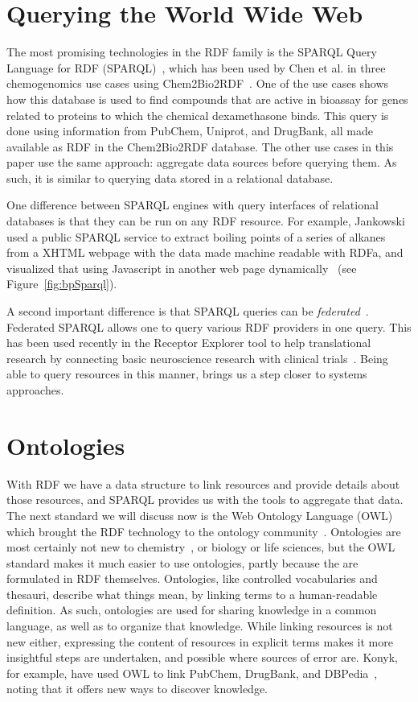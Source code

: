 \documentclass[10pt]{bmc_article}
\newenvironment{bmcformat}{\begin{raggedright}\baselineskip20pt\sloppy\setboolean{publ}{false}}{\end{raggedright}\baselineskip20pt\sloppy}
\begin{document}
\begin{bmcformat}
\section{Querying the World Wide Web}

The most promising technologies in the RDF family is the
SPARQL Query Language for RDF (SPARQL)~\cite{PrudHommeaux2008}, which has been
used by Chen et al. in three chemogenomics use cases using Chem2Bio2RDF~\cite{CHE2010}. 
One of the use cases shows how this database is used to find compounds 
that are active in bioassay for genes related to proteins
to which the chemical dexamethasone binds. This query is done using information
from PubChem, Uniprot, and DrugBank, all made available as RDF in the Chem2Bio2RDF
database. The other use cases in this paper use the same approach:
aggregate data sources before querying them. As such, it is similar to querying
data stored in a relational database.

One difference between SPARQL engines with query interfaces of relational databases
is that they can be run on any RDF resource. For example, Jankowski used a public
SPARQL service to extract boiling points of a series of alkanes from a XHTML
webpage with the data made machine readable with RDFa, and visualized that using
Javascript in another web page dynamically~\cite{Jankowski2010} (see
Figure~\ref{fig:bpSparql}).

A second important difference is that SPARQL queries can be
\textit{federated}~\cite{Prudhommeaux2007}.
Federated SPARQL allows one to query various RDF providers in one query. This has
been used recently in the Receptor Explorer tool to help translational research
by connecting basic neuroscience research with clinical trials~\cite{Cheung2009}.
Being able to query resources in this manner, brings us a step closer to
systems approaches.

\section{Ontologies}

With RDF we have a data structure to link resources and provide details about
those resources, and SPARQL provides us with the tools to aggregate that data.
The next standard we will discuss now is the Web Ontology
Language (OWL) which brought the RDF technology to the ontology community~\cite{GUN2004}.
Ontologies are most certainly not new to chemistry~\cite{Gordon1988}, or biology or life sciences,
but the OWL standard makes it much easier to use ontologies, partly because
the are formulated in RDF themselves. Ontologies, like
controlled vocabularies and thesauri, describe what things mean, by linking
terms to a human-readable definition. As such, ontologies are used for sharing
knowledge in a common language, as well as to organize that knowledge.
While linking resources is not new either, expressing the content of resources
in explicit terms makes it more insightful steps are undertaken, and possible
where sources of error are. Konyk, for example, have used OWL to link PubChem,
DrugBank, and DBPedia~\cite{Konyk2008}, noting that it offers new ways to
discover knowledge.


\end{bmcformat}
\end{document}
